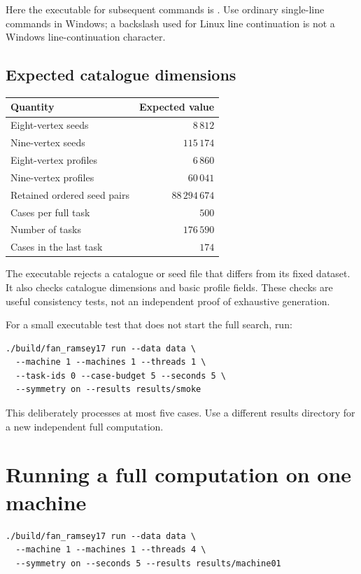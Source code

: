 \documentclass[11pt]{article}
\newcommand{\file}[1]{\path{#1}}
\begin{document}
Here the executable for subsequent commands is
\file{src\fan_ramsey17.exe}. Use ordinary single-line commands in
Windows; a backslash used for Linux line continuation is not a Windows
line-continuation character.

\subsection{Expected catalogue dimensions}

\begin{center}
\begin{tabular}{@{}lr@{}}
\toprule
Quantity & Expected value \\
\midrule
Eight-vertex seeds & $8\,812$ \\
Nine-vertex seeds & $115\,174$ \\
Eight-vertex profiles & $6\,860$ \\
Nine-vertex profiles & $60\,041$ \\
Retained ordered seed pairs & $88\,294\,674$ \\
Cases per full task & $500$ \\
Number of tasks & $176\,590$ \\
Cases in the last task & $174$ \\
\bottomrule
\end{tabular}
\end{center}

The executable rejects a catalogue or seed file that differs from its
fixed dataset. It also checks catalogue dimensions and basic profile
fields. These checks are useful consistency tests, not an independent
proof of exhaustive generation.

For a small executable test that does not start the full search, run:
\begingroup\footnotesize
\begin{verbatim}
./build/fan_ramsey17 run --data data \
  --machine 1 --machines 1 --threads 1 \
  --task-ids 0 --case-budget 5 --seconds 5 \
  --symmetry on --results results/smoke
\end{verbatim}
\endgroup
This deliberately processes at most five cases. Use a different results
directory for a new independent full computation.

\section{Running a full computation on one machine}

\begingroup\footnotesize
\begin{verbatim}
./build/fan_ramsey17 run --data data \
  --machine 1 --machines 1 --threads 4 \
  --symmetry on --seconds 5 --results results/machine01
\end{verbatim}
\endgroup
\end{document}
